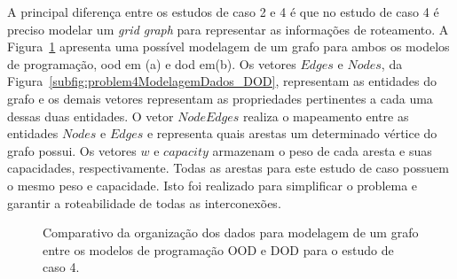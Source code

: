 A principal diferença entre os estudos de caso 2 e 4 é que no estudo de caso 4 é preciso modelar um \textit{grid graph} para representar as informações de roteamento.
A Figura~\ref{fig:problem4ModelagemDados} apresenta uma possível modelagem de um grafo para ambos os modelos de programação, \ac{ood} em (a) e \ac{dod} em(b).
Os vetores $Edges$ e $Nodes$, da Figura~\ref{subfig:problem4ModelagemDados_DOD}, representam as entidades do grafo e os demais vetores representam as propriedades pertinentes a cada uma dessas duas entidades. O vetor $Node Edges$ realiza o mapeamento entre as entidades $Nodes$ e $Edges$ e representa quais arestas um determinado vértice do grafo possui.
Os vetores $w$ e $capacity$ armazenam o peso de cada aresta e suas capacidades, respectivamente.
Todas as arestas para este estudo de caso possuem o mesmo peso e capacidade. 
Isto foi realizado para simplificar o problema e garantir a roteabilidade de todas as interconexões.

\begin{figure}[h!b]
    \centering
    \caption[Organização dos dados estudo de caso 4]{Comparativo da organização dos dados para modelagem de um grafo entre os modelos de programação OOD e DOD para o estudo de caso 4.}
    \label{fig:problem4ModelagemDados}
\end{figure}

